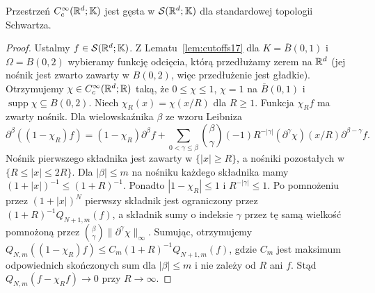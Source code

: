 \begin{twierdzenie}
\label{thm:density-schwartz17}
Przestrzeń $C_c^\infty(\mathbb R^d;\mathbb K)$ jest gęsta w
$\mathcal S(\mathbb R^d;\mathbb K)$ dla standardowej topologii Schwartza.
\end{twierdzenie}
\begin{proof}
Ustalmy $f\in\mathcal S(\mathbb R^d;\mathbb K)$.
Z Lematu~\ref{lem:cutoffs17} dla $K=\overline B(0,1)$
i $\Omega=B(0,2)$ wybieramy funkcję odcięcia, którą
przedłużamy zerem na $\mathbb R^d$ (jej nośnik jest zwarto zawarty
w $B(0,2)$, więc przedłużenie jest gładkie).
Otrzymujemy $\chi\in C_c^\infty(\mathbb R^d;\mathbb R)$ taką, że
$0\le\chi\le1$, $\chi=1$ na $\overline B(0,1)$
i $\operatorname{supp}\chi\subseteq B(0,2)$.
Niech $\chi_R(x)=\chi(x/R)$ dla $R\ge1$.
Funkcja $\chi_R f$ ma zwarty nośnik. Dla wielowskaźnika $\beta$
ze wzoru Leibniza
\[
\partial^\beta((1-\chi_R)f)
=(1-\chi_R)\partial^\beta f+
\sum_{0<\gamma\le\beta}\binom{\beta}{\gamma}
 (-1)R^{-|\gamma|}(\partial^\gamma\chi)(x/R)
 \partial^{\beta-\gamma}f.
\]
Nośnik pierwszego składnika jest zawarty w $\{|x|\ge R\}$,
a nośniki pozostałych w $\{R\le|x|\le2R\}$.
Dla $|\beta|\le m$ na nośniku każdego składnika mamy
$(1+|x|)^{-1}\le(1+R)^{-1}$. Ponadto
$|1-\chi_R|\le1$ i $R^{-|\gamma|}\le1$.
Po pomnożeniu przez $(1+|x|)^N$ pierwszy składnik jest
ograniczony przez $(1+R)^{-1}Q_{N+1,m}(f)$, a składnik
sumy o indeksie $\gamma$ przez tę samą wielkość
pomnożoną przez $\binom{\beta}{\gamma}\|\partial^\gamma\chi\|_\infty$.
Sumując, otrzymujemy
$Q_{N,m}((1-\chi_R)f)\le C_m(1+R)^{-1}Q_{N+1,m}(f)$,
gdzie $C_m$ jest maksimum odpowiednich skończonych sum
dla $|\beta|\le m$ i nie zależy od $R$ ani $f$.
Stąd $Q_{N,m}(f-\chi_Rf)\to0$ przy $R\to\infty$.
\end{proof}

